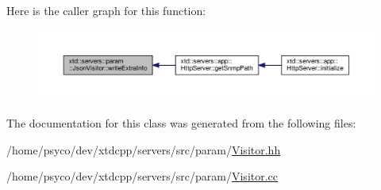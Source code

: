 Here is the caller graph for this function\+:
\nopagebreak
\begin{figure}[H]
\begin{center}
\leavevmode
\includegraphics[width=350pt]{classxtd_1_1servers_1_1param_1_1JsonVisitor_a764dbadc7c9d477c5bda84ed901de3a1_icgraph}
\end{center}
\end{figure}




The documentation for this class was generated from the following files\+:\begin{DoxyCompactItemize}
\item 
/home/psyco/dev/xtdcpp/servers/src/param/\hyperlink{Visitor_8hh}{Visitor.\+hh}\item 
/home/psyco/dev/xtdcpp/servers/src/param/\hyperlink{Visitor_8cc}{Visitor.\+cc}\end{DoxyCompactItemize}
